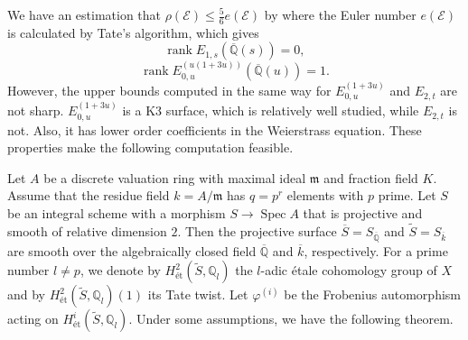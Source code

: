 \documentclass[a4paper]{jarticle} %
\theoremstyle{definition}
\newtheorem{thm}{Theorem}[section]
\theoremstyle{remark}
\DeclareMathOperator{\rank}{rank}
\DeclareMathOperator{\NS}{NS}
\DeclareMathOperator{\Spec}{Spec}
\begin{document}
We have an estimation that $\rho(\mathcal{E}) \leq \frac{5}{6} e(\mathcal{E})$ by \cite{ref:naskreckiphd} where the Euler number $e(\mathcal{E})$ is calculated by Tate's algorithm, which gives
\begin{equation*}
    \rank E_{1,s}(\overline{\mathbb{Q}}(s)) = 0,
\end{equation*}
\begin{equation*}
    \rank E_{0,u}^{(u(1 + 3u))}(\overline{\mathbb{Q}}(u)) = 1.
\end{equation*}
However, the upper bounds computed in the same way for $E_{0,u}^{(1 + 3u)}$ and $E_{2,t}$ are not sharp.
$E_{0,u}^{(1 + 3u)}$ is a K3 surface, which is relatively well studied, while $E_{2,t}$ is not.
Also, it has lower order coefficients in the Weierstrass equation.
These properties make the following computation feasible.

Let $A$ be a discrete valuation ring with maximal ideal $\mathfrak{m}$ and fraction field $K$.
Assume that the residue field $k=A/\mathfrak{m}$ has $q=p^r$ elements with $p$ prime.
Let $S$ be an integral scheme with a morphism $S \to \Spec A$ that is projective and smooth of relative dimension $2$.
Then the projective surface $\overline{S}=S_{\overline{\mathbb{Q}}}$ and $\tilde{S}=S_{\overline{k}}$ are smooth over the algebraically closed field $\overline{\mathbb{Q}}$ and $\overline{k}$, respectively.
For a prime number $l \neq p$, we denote by $H_{\text{\'et}}^{2}(\tilde{S}, \mathbb{Q}_l)$ the $l$-adic \'etale cohomology group of $X$ and by $H_{\text{\'et}}^{2}(\tilde{S}, \mathbb{Q}_l)(1)$ its Tate twist.
Let $\varphi^{(i)}$ be the Frobenius automorphism acting on $H_{\text{\'et}}^{i}(\tilde{S}, \mathbb{Q}_l)$.
Under some assumptions, we have the following theorem.

\end{document}
